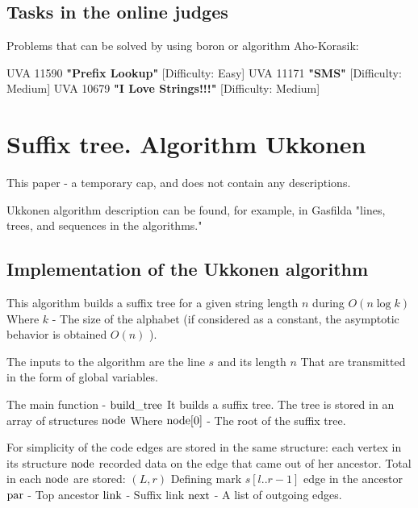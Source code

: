 \subsection{ Tasks in the online judges }

Problems that can be solved by using boron or algorithm Aho-Korasik:

UVA 11590 \textbf{"Prefix Lookup"} [Difficulty: Easy]
UVA 11171 \textbf{"SMS"} [Difficulty: Medium]
UVA 10679 \textbf{"I Love Strings!!!"} [Difficulty: Medium]
\section{ Suffix tree. Algorithm Ukkonen }
This paper - a temporary cap, and does not contain any descriptions.

Ukkonen algorithm description can be found, for example, in Gasfilda "lines, trees, and sequences in the algorithms."

\subsection{ Implementation of the Ukkonen algorithm }

This algorithm builds a suffix tree for a given string length $n$ during $O (n \log k)$ Where $k$ - The size of the alphabet (if considered as a constant, the asymptotic behavior is obtained $O (n)$ ).

The inputs to the algorithm are the line $s$ and its length $n$ That are transmitted in the form of global variables.

The main function - $\rm build \_tree$ It builds a suffix tree. The tree is stored in an array of structures $\rm node$ Where ${\rm node} [0]$ - The root of the suffix tree.

For simplicity of the code edges are stored in the same structure: each vertex in its structure $\rm node$ recorded data on the edge that came out of her ancestor. Total in each $\rm node$ are stored: $(L, r)$ Defining mark $s [l.. r-1]$ edge in the ancestor $\rm par$ - Top ancestor $\rm link$ - Suffix link $\rm next$ - A list of outgoing edges.

